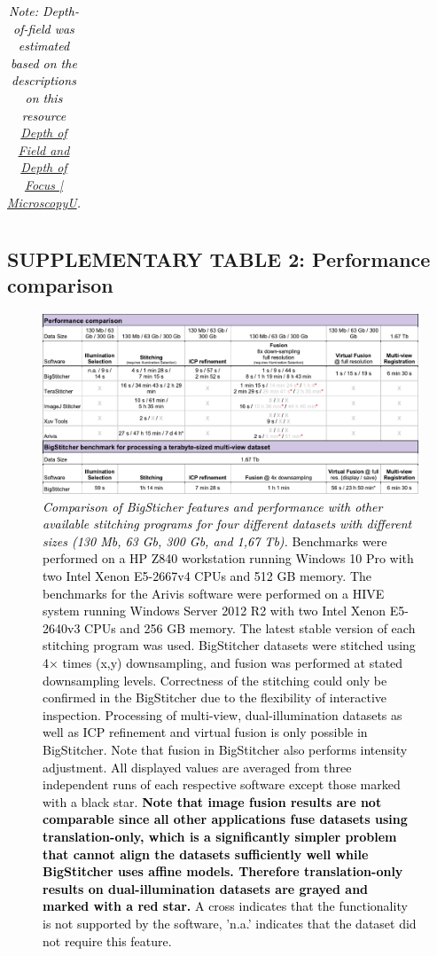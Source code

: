 \documentclass[]{spie}  %
\def\red{\textcolor{black}}
\begin{document}
\begin{landscape}
{\begin{longtable}{lll}
\caption{\red{\emph{Note: Depth-of-field was estimated based on the descriptions on this resource \href{https://www.microscopyu.com/microscopy-basics/depth-of-field-and-depth-of-focus}{Depth of Field and Depth of Focus | MicroscopyU}.}}}

\end{longtable}}

\pagebreak

\captionsetup{singlelinecheck = false, format=plain, justification=justified, labelsep=space}

\subsection*{SUPPLEMENTARY TABLE 2: Performance comparison}
\vspace{-3mm}
\begin{figure}[h!]
\center\includegraphics[width=\textwidth+5.00cm]{supp_table_1.pdf}
\vspace{-3mm}
\caption{\hspace{-0.5mm} \red{\emph{Comparison of BigSticher features and performance with other available stitching programs for four different datasets with different sizes (130 Mb, 63 Gb, 300 Gb, and 1,67 Tb).} Benchmarks were performed on a HP Z840 workstation running Windows 10 Pro with two Intel Xenon E5-2667v4 CPUs and 512 GB memory. The benchmarks for the Arivis software were performed on a HIVE system running Windows Server 2012 R2 with two Intel Xenon E5-2640v3 CPUs and 256 GB memory. The latest stable version of each stitching program was used. BigStitcher datasets were stitched using 4$\times$ times (x,y) downsampling, and fusion was performed at stated downsampling levels. Correctness of the stitching could only be confirmed in the BigStitcher due to the flexibility of interactive inspection. Processing of multi-view, dual-illumination datasets as well as ICP refinement and virtual fusion is only possible in BigStitcher. Note that fusion in BigStitcher also performs intensity adjustment. All displayed values are averaged from three independent runs of each respective software except those marked with a black star. \textbf{Note that image fusion results are not comparable since all other applications fuse datasets using translation-only, which is a significantly simpler problem that cannot align the datasets sufficiently well while BigStitcher uses affine models. Therefore translation-only results on dual-illumination datasets are grayed and marked with a red star.} A cross indicates that the functionality is not supported by the software, 'n.a.' indicates that the dataset did not require this feature.}
}
\end{figure}
\end{landscape}
\end{document}
